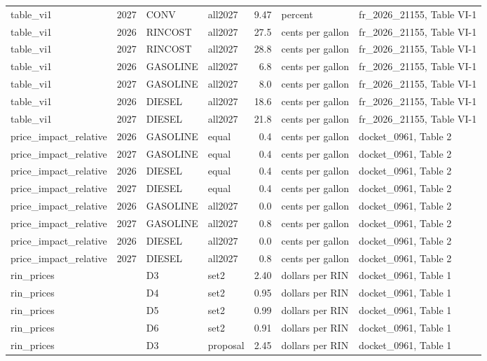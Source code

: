 \begin{longtable}{p{2.3cm}p{0.7cm}p{1.0cm}p{2.6cm}rp{1.7cm}p{4.6cm}}
table\_vi1 & 2027 & CONV & all2027 & 9.47 & percent & fr\_2026\_21155, Table VI-1 \\
table\_vi1 & 2026 & RINCOST & all2027 & 27.5 & cents per gallon & fr\_2026\_21155, Table VI-1 \\
table\_vi1 & 2027 & RINCOST & all2027 & 28.8 & cents per gallon & fr\_2026\_21155, Table VI-1 \\
table\_vi1 & 2026 & GASOLINE & all2027 & 6.8 & cents per gallon & fr\_2026\_21155, Table VI-1 \\
table\_vi1 & 2027 & GASOLINE & all2027 & 8.0 & cents per gallon & fr\_2026\_21155, Table VI-1 \\
table\_vi1 & 2026 & DIESEL & all2027 & 18.6 & cents per gallon & fr\_2026\_21155, Table VI-1 \\
table\_vi1 & 2027 & DIESEL & all2027 & 21.8 & cents per gallon & fr\_2026\_21155, Table VI-1 \\
price\_impact\_relative & 2026 & GASOLINE & equal & 0.4 & cents per gallon & docket\_0961, Table 2 \\
price\_impact\_relative & 2027 & GASOLINE & equal & 0.4 & cents per gallon & docket\_0961, Table 2 \\
price\_impact\_relative & 2026 & DIESEL & equal & 0.4 & cents per gallon & docket\_0961, Table 2 \\
price\_impact\_relative & 2027 & DIESEL & equal & 0.4 & cents per gallon & docket\_0961, Table 2 \\
price\_impact\_relative & 2026 & GASOLINE & all2027 & 0.0 & cents per gallon & docket\_0961, Table 2 \\
price\_impact\_relative & 2027 & GASOLINE & all2027 & 0.8 & cents per gallon & docket\_0961, Table 2 \\
price\_impact\_relative & 2026 & DIESEL & all2027 & 0.0 & cents per gallon & docket\_0961, Table 2 \\
price\_impact\_relative & 2027 & DIESEL & all2027 & 0.8 & cents per gallon & docket\_0961, Table 2 \\
rin\_prices &  & D3 & set2 & 2.40 & dollars per RIN & docket\_0961, Table 1 \\
rin\_prices &  & D4 & set2 & 0.95 & dollars per RIN & docket\_0961, Table 1 \\
rin\_prices &  & D5 & set2 & 0.99 & dollars per RIN & docket\_0961, Table 1 \\
rin\_prices &  & D6 & set2 & 0.91 & dollars per RIN & docket\_0961, Table 1 \\
rin\_prices &  & D3 & proposal & 2.45 & dollars per RIN & docket\_0961, Table 1 \\

\end{longtable}
